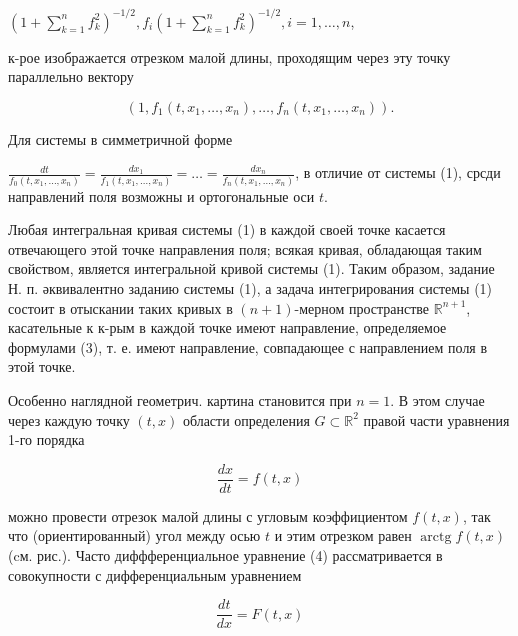 \documentclass[10pt]{article}
\begin{document}
$\left(1+\sum_{k=1}^{n} f_{k}^{2}\right)^{-1 / 2}, f_{i}\left(1+\sum_{k=1}^{n} f_{k}^{2}\right)^{-1 / 2}, i=1, \ldots, n$,



к-рое изображается отрезком малой длины, проходящим через эту точку параллельно вектору



\[

\left(1, f_{1}\left(t, x_{1}, \ldots, x_{n}\right), \ldots, f_{n}\left(t, x_{1}, \ldots, x_{n}\right)\right) .

\]



Для системы в симметричной форме



$\frac{d t}{f_{0}\left(t, x_{1}, \ldots, x_{n}\right)}=\frac{d x_{1}}{f_{1}\left(t, x_{1}, \ldots, x_{n}\right)}=\ldots=\frac{d x_{n}}{f_{n}\left(t, x_{1}, \ldots, x_{n}\right)}$, в отличие от системы (1), срсди направлений поля возможны и ортогональные оси $t$.



Любая интегральная кривая системы (1) в каждой своей точке касается отвечающего этой точке направления поля; всякая кривая, обладающая таким свойством, является интегральной кривой системы (1). Таким образом, задание Н. п. әквивалентно заданию системы (1), а задача интегрирования системы (1) состоит в отыскании таких кривых в $(n+1)$-мерном пространстве $\mathbb{R}^{n+1}$, касательные к к-рым в каждой точке имеют направление, определяемое формулами (3), т. е. имеют направление, совпадающее с направлением поля в этой точке.



Особенно наглядной геометрич. картина становится при $n=1$. В этом случае через каждую точку $(t, x)$ области определения $G \subset \mathbb{R}^{2}$ правой части уравнения 1-го порядка



\[

\frac{d x}{d t}=f(t, x)

\]



можно провести отрезок малой длины с угловым коэффициентом $f(t, x)$, так что (ориентированный) угол между осью $t$ и этим отрезком равен $\operatorname{arctg} f(t, x)$ (cм. рис.). Часто диффференциальное уравнение (4) рассматривается в совокупности с дифференциальным уравнением



\[

\frac{d t}{d x}=F(t, x)

\]
\end{document}
